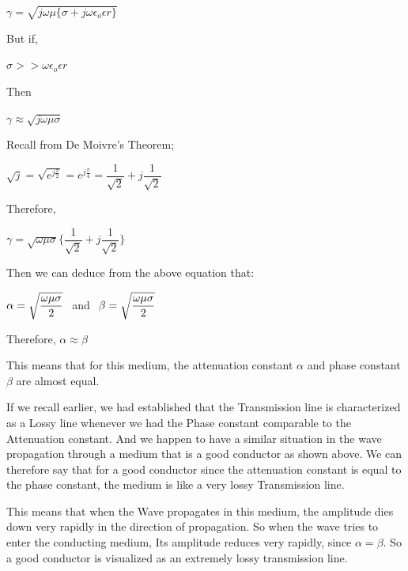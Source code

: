 \begin{center}
$\gamma=\sqrt{j\omega\mu\{\sigma+j\omega\epsilon_{o}\epsilon{r}\}}$	
\end{center}

But if, 
\begin{center}
$\sigma>>\omega\epsilon_{o}\epsilon{r}$
\end{center}

Then

$\gamma\approx\sqrt{j\omega\mu\sigma}$

Recall from De Moivre's Theorem;	

\begin{center}
$\sqrt{j}=\sqrt{e^{j\frac{\pi}{2}}}=e^{j\frac{\pi}{4}}=\dfrac{1}{\sqrt{2}}+j\dfrac{1}{\sqrt{2}}$
\end{center}

Therefore,

\begin{center}		
$\gamma = \sqrt{\omega\mu\sigma}\{\dfrac{1}{\sqrt{2}}+j\dfrac{1}{\sqrt{2}}\}$

\end{center}

Then we can deduce from the above equation that:

\begin{center}

$\alpha=\sqrt{\dfrac{\omega\mu\sigma}{2}}\hspace{0.15cm}$ and $\hspace{0.15cm}\beta=\sqrt{\dfrac{\omega\mu\sigma}{2}}$

\end{center}

Therefore,
$\alpha\approx\beta$

This means that for this medium, the attenuation constant $\alpha$ and phase constant $\beta$ are almost equal.

If we recall earlier, we had established that the Transmission line is characterized as a Lossy line whenever we had the Phase constant comparable to the Attenuation constant. And we happen to have a similar situation in the wave propagation through a medium that is a good conductor as shown above. We can therefore say that for a good conductor since the attenuation constant is equal to the phase constant, the medium is like a very lossy Transmission line.

This means that when the Wave propagates in this medium, the amplitude dies down very rapidly in the direction of propagation. So when the wave tries to enter the conducting medium, Its amplitude reduces very rapidly, since $\alpha=\beta$. So a good conductor is visualized as an extremely lossy transmission line.

